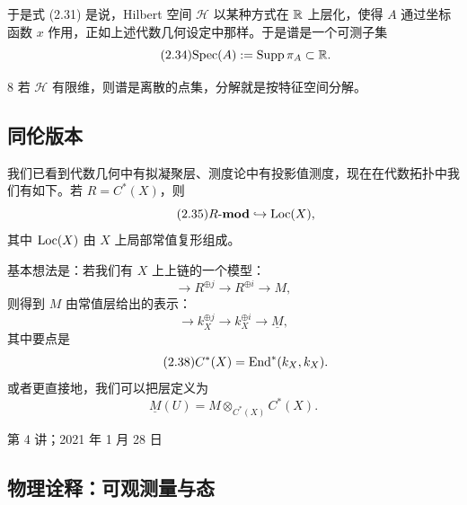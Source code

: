 于是式 (2.31) 是说，Hilbert 空间 $\mathcal{H}$ 以某种方式在 $\mathbb{R}$ 上层化，使得 $A$ 通过坐标函数 $x$ 作用，正如上述代数几何设定中那样。于是谱是一个可测子集
\begin{equation}\tag{2.34}
\mathrm{Spec}(A):=\operatorname{Supp}\pi_A\subset\mathbb{R}.
\end{equation}

\begin{srcex}{8}
若 $\mathcal{H}$ 有限维，则谱是离散的点集，分解就是按特征空间分解。
\end{srcex}

\subsection{同伦版本}

我们已看到代数几何中有拟凝聚层、测度论中有投影值测度，现在在代数拓扑中我们有如下。若 $R=C^{*}(X)$，则
\begin{equation}\tag{2.35}
R\text{-}\mathbf{mod}\hookrightarrow \mathrm{Loc}(X),
\end{equation}
其中 $\mathrm{Loc}(X)$ 由 $X$ 上局部常值复形组成。

基本想法是：若我们有 $X$ 上上链的一个模型：
\begin{equation}\tag{2.36}
\to R^{\oplus j}\to R^{\oplus i}\to M,
\end{equation}
则得到 $M$ 由常值层给出的表示：
\begin{equation}\tag{2.37}
\to k_X^{\oplus j}\to k_X^{\oplus i}\to\underline{M},
\end{equation}
其中要点是
\begin{equation}\tag{2.38}
C^{*}(X)=\mathrm{End}^{*}(k_X,k_X).
\end{equation}
或者更直接地，我们可以把层定义为
\begin{equation}\tag{2.39}
\underline{M}(U)=M\otimes_{C^{*}(X)}C^{*}(X).
\end{equation}

\begin{flushright}\small 第 4 讲；2021 年 1 月 28 日\end{flushright}

\subsection{物理诠释：可观测量与态}

